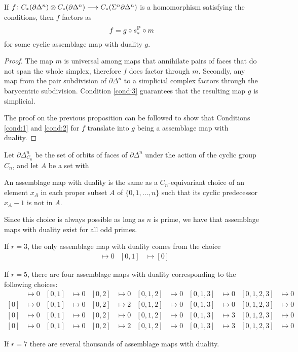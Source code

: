 \begin{proposition} If $f\colon C_*(\partial \Delta^n)\otimes C_*(\partial \Delta^n)\longrightarrow C_*(\Sigma^n\partial \Delta^n)$ is a homomorphism satisfying the conditions, then $f$ factors as
\[f = g\circ s_*^{\operatorname{P}}\circ m\]
for some cyclic assemblage map with duality $g$.
\end{proposition}
\begin{proof}
The map $m$ is universal among maps that annihilate pairs of faces that do not span the whole simplex, therefore $f$ does factor through $m$. Secondly, any map from the pair subdivision of $\partial \Delta^n$ to a simplicial complex factors through the barycentric subdivision. Condition \eqref{cond:3} guarantees that the resulting map $g$ is simplicial.

The proof on the previous proposition can be followed to show that Conditions \eqref{cond:1} and \eqref{cond:2} for $f$ translate into $g$ being a assemblage map with duality.
\end{proof}

Let $\partial \Delta^n_{C_n}$ be the set of orbits of faces of $\partial \Delta^n$ under the action of the cyclic group $C_n$, and let $A$ be a set with


\begin{lemma} An assemblage map with duality is the same as a  $C_n$-equivariant choice of an element $x_A$ in each proper subset $A$ of $\{0,1,\ldots,n\}$ such that its cyclic predecessor $x_A-1$ is not in $A$.
\end{lemma}
Since this choice is always possible as long as $n$ is prime, we have that assemblage maps with duality exist for all odd primes.
\begin{example}
    If $r=3$, the only assemblage map with duality comes from the choice
    \begin{align*}
        [0]&\mapsto 0 & [0,1]&\mapsto [0]
    \end{align*}
\end{example}
\begin{example}
    If $r=5$, there are four assemblage maps with duality corresponding to the following choices:
    \begin{align*}
        [0]&\mapsto 0 & [0,1]&\mapsto 0 & [0,2]&\mapsto 0 & [0,1,2]&\mapsto 0 & [0,1,3] & \mapsto 0 & [0,1,2,3] & \mapsto 0 \\
        [0]&\mapsto 0 & [0,1]&\mapsto 0 & [0,2]&\mapsto 2 & [0,1,2]&\mapsto 0 & [0,1,3] & \mapsto 0 & [0,1,2,3] & \mapsto 0 \\
        [0]&\mapsto 0 & [0,1]&\mapsto 0 & [0,2]&\mapsto 0 & [0,1,2]&\mapsto 0 & [0,1,3] & \mapsto 3 & [0,1,2,3] & \mapsto 0 \\
        [0]&\mapsto 0 & [0,1]&\mapsto 0 & [0,2]&\mapsto 2 & [0,1,2]&\mapsto 0 & [0,1,3] & \mapsto 3 & [0,1,2,3] & \mapsto 0 
    \end{align*}
\end{example}
If $r=7$ there are several thousands of assemblage maps with duality. 




